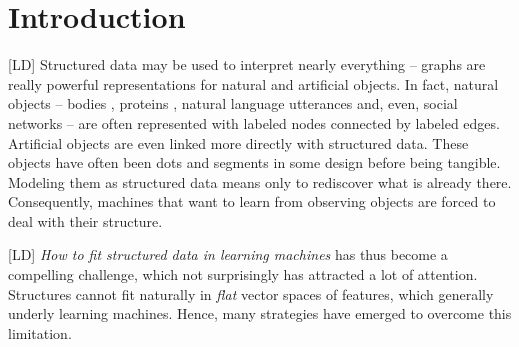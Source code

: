 \documentclass[twoside,11pt]{article}
\def\comment#1#2{}
\def\LD#1{[{\color{blue}L}D] {\color{blue}#1}}
\begin{document}
\section{Introduction}

\comment{[R2,C5][IssueC]}{Introduction: the position of the paper is extremely narrow, and the authors only connect to other work 
on tree kernels. It is thus likely to be ignored by many reader interested in ML for NLP. I believe this 
paper is part of a trend: using recursive structures to handle problems when one needs a proper 
representation for long term dependencies. The most vocal representative of this new trend is Richard 
Socher. It would also have been interesting to compare DTK to Recursive NN on some problems that are 
much more recent and critical that ones used for experiments in this paper, such as sentiment analysis.}

\LD{Structured data may be used to interpret nearly everything -- 
graphs are really powerful representations for natural and artificial objects.} 
In fact, natural objects -- bodies \cite{boh}, proteins \cite{boh}, natural language utterances \cite{boh} and, even, social networks \cite{boh} -- are often represented  with 
labeled nodes connected by labeled edges.
Artificial objects are even linked more directly with structured data.
These objects have often been dots and segments in some design before being tangible. 
Modeling them as structured data means only to rediscover what is already there. 
Consequently, machines that want to learn from observing objects are forced to deal with their structure.

\LD{\emph{How to fit structured data in learning machines} has thus become a compelling challenge, which not surprisingly has attracted a lot of attention.} 
Structures cannot fit naturally in \emph{flat} vector spaces of features, which generally underly learning machines. 
Hence, many strategies have emerged to overcome this limitation.
\end{document}
